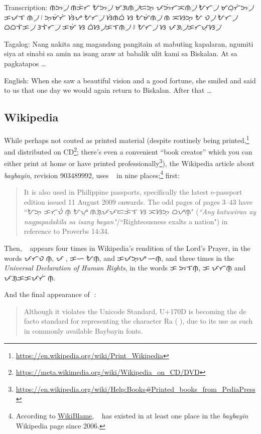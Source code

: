 \documentclass[a4paper,pagesize,openany,14pt,parskip=never]{scrbook}
\newcommand{\≈}{$\approx$}
\newcommand{\ra}{{\baybayin ᜍ}}
\begin{document}
Transcription: {\baybayin ᜈᜅ᜴ ᜈᜃᜒᜆ ᜀᜅ᜴ ᜋᜄᜈ᜴ᜇᜅ᜔ ᜉᜅᜒᜆᜁᜈ᜴ ᜀᜆ᜴ ᜋᜊᜓᜆᜒᜅ᜴ ᜃᜉᜎᜍᜈ᜴ ᜵ ᜅᜓᜋᜒᜆᜒ ᜐᜒᜌ ᜀᜆ᜴ ᜐᜒᜈᜊᜒ ᜐ ᜀᜋᜒᜈ᜴ ᜈ ᜁᜐᜅ᜔ ᜀᜍᜏ᜴ ᜀᜆ᜴ ᜊᜊᜎᜒᜃ᜴ ᜂᜎᜒᜆ᜴ ᜃᜋᜒ ᜐ ᜊᜒᜐ᜴ᜃᜎᜈ᜴ ᜶ ᜀᜆ᜴ ᜐ ᜉᜄ᜴ᜃᜆᜉᜓᜐ᜴}

Tagalog: Nang nakita ang magandang pangitain at mabuting kapalaran, ngumiti siya at sinabi sa amin na isang araw at babalik ulit kami sa Biskalan. At sa pagkatapos \ldots

English: When she saw a beautiful vision and a good fortune, she smiled and said to us that one day we would again return to Biskalan. After that \ldots

\subsection{Wikipedia}

While perhaps not couted as printed material (despite routinely being printed,\footnote{\url{https://en.wikipedia.org/wiki/Print\_Wikipedia}} and distributed on CD\footnote{\url{https://meta.wikimedia.org/wiki/Wikipedia\_on\_CD/DVD}}; there's even a convenient ``book creator'' which you can either print at home or have printed professionally\footnote{\url{https://en.wikipedia.org/wiki/Help:Books\#Printed\_books\_from\_PediaPress}}), the Wikipedia article about {\em baybayin}, revision 903489992, uses \ra\ in nine places;\footnote{According to \href{http://wikipedia.ramselehof.de/wikiblame.php}{WikiBlame}, \ra\ has existed in at least one place in the {\em baybayin} Wikipedia page since 2006.} first:

\begin{quote}
    It is also used in Philippine passports, specifically the latest e-passport edition issued 11 August 2009 onwards. The odd pages of pages 3–43 have ``{\baybayin ᜀᜅ᜔ ᜃᜆᜓᜏᜒᜍᜈ᜔ ᜀᜌ᜔ ᜈᜄ᜔ᜉᜉᜇᜃᜒᜎ ᜐ ᜁᜐᜅ᜔ ᜊᜌᜈ᜔}" ({\em ``Ang katuwiran ay nagpapadakila sa isang bayan"}/``Righteousness exalts a nation") in reference to Proverbs 14:34.
\end{quote}

Then, \ra\ appears four times in Wikipedia's rendition of the Lord's Prayer, in the words {\baybayin ᜉᜆᜏᜍᜒᜈ᜔}, {\baybayin ᜉᜍ}, {\baybayin ᜃᜑᜍᜒᜀᜈ᜔}, and {\baybayin ᜃᜉᜅ᜔ᜌᜍᜒᜑᜈ᜔}, and three times in the {\em Universal Declaration of Human Rights}, in the words {\baybayin ᜃᜍᜅᜎᜈ᜔}, {\baybayin ᜃᜍᜉᜆᜈ᜔} and {\baybayin ᜉᜄ᜔ᜃᜃᜉᜆᜒᜍᜈ᜔}.

And the final appearance of \ra:

\begin{quote}
    Although it violates the Unicode Standard, U+170D is becoming the de facto standard for representing the character Ra ({\baybayin ᜍ}), due to its use as such in commonly available Baybayin fonts.
\end{quote}
\end{document}
